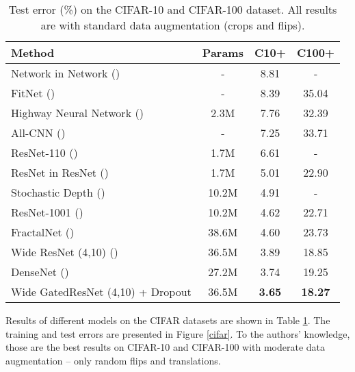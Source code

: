 \documentclass{article} %
\begin{document}
\begin{table}[h!]
\centering
    \begin{tabular}{ | l | c | c | c |}
    \hline
    Method    			& 		  	Params & C10+  & C100+  \\ \hline

    Network in Network (\cite{nin})			& 			-  & 	8.81  &  - \\ 
    FitNet (\cite{fitnet})			& 			-  & 	8.39   & 	35.04\\ 
    Highway Neural Network (\cite{highway})			& 			2.3M  & 	7.76   & 	32.39 \\
    All-CNN (\cite{allcnn})			& 			-  & 	7.25  & 	33.71  \\
\hline
    ResNet-110 (\cite{resnet1})			& 			1.7M  & 	6.61  & 	- \\ 
    ResNet in ResNet (\cite{rir})			& 			1.7M  & 	5.01   & 	22.90 \\ 
    Stochastic Depth (\cite{stdepth})	& 			10.2M & 	4.91   & 	- \\ 
    ResNet-1001 (\cite{resnet2}) & 			10.2M & 	4.62   & 	22.71 \\ 
    FractalNet (\cite{fractal}) & 			38.6M & 	4.60     & 	23.73 \\ 
    Wide ResNet (4,10) (\cite{wide})	& 			36.5M & 	3.89  & 	18.85 \\ 
    DenseNet (\cite{densenet})	& 			27.2M & 	3.74      & 	19.25\\ 
    Wide GatedResNet (4,10) + Dropout	& 			36.5M 	& 	\textbf{3.65}  & 	\textbf{18.27} \\ \hline
    \end{tabular}
\caption{Test error (\%) on the CIFAR-10 and CIFAR-100 dataset. All results are with standard data augmentation (crops and flips).}
    \label{cifar_all}   
\end{table}

Results of different models on the CIFAR datasets are shown in Table \ref{cifar_all}. The training and test errors are presented in Figure \ref{cifar}. To the authors' knowledge, those are the best results on CIFAR-10 and CIFAR-100 with moderate data augmentation -- only random flips and translations.
\end{document}
